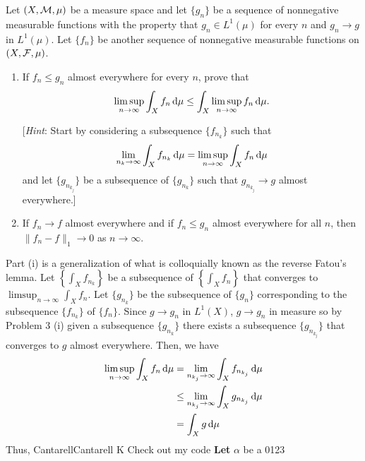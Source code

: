 \begin{problem}
  Let $(X,\mathcal{M},\mu)$ be a measure space and let $\{g_n\}$ be a sequence of
  nonnegative measurable functions with the property that $g_n\in L^1(\mu)$
  for every $n$ and $g_n\to g$ in $L^1(\mu)$. Let $\{f_n\}$ be another
  sequence of nonnegative measurable functions on $(X,\mathcal{F},\mu)$.
  \begin{enumerate}[label=(\roman*),noitemsep]
  \item If $f_n\leq g_n$ almost everywhere for every $n$, prove that
    \[
      \limsup_{n\to\infty}\int_X
      f_n\mathop{}\!\mathrm{d}\mu\leq\int_X\limsup_{n\to\infty}f_n\mathop{}\!\mathrm{d}\mu.
    \]

    [\emph{Hint}: Start by considering a subsequence $\{f_{n_k}\}$ such
    that
    \[
      \lim_{n_k\to\infty}\int_X
      f_{n_k}\mathop{}\!\mathrm{d}\mu=\limsup_{n\to\infty}\int_X f_n\mathop{}\!\mathrm{d}\mu
    \]
    and let $\{g_{n_{k_j}}\}$ be a subsequence of $\{g_{n_k}\}$ such
    that $g_{n_{k_j}}\to g$ almost everywhere.]
  \item If $f_n\to f$ almost everywhere and if $f_n\leq g_n$ almost
    everywhere for all $n$, then $\|f_n-f\|_1\to 0$ as $n\to\infty$.
  \end{enumerate}
\end{problem}
\begin{solution}
  Part (i) is a generalization of what is colloquially known as the reverse
  Fatou's lemma. Let $\left\{\int_X f_{n_k}\right\}$ be a subsequence of
  $\left\{\int_X f_n\right\}$ that converges to
  $\limsup_{n\to\infty}\int_X f_n$. Let $\{g_{n_k}\}$ be the subsequence of
  $\{g_n\}$ corresponding to the subsequence $\{f_{n_k}\}$ of
  $\{f_n\}$. Since $g\to g_n$ in $L^1(X)$, $g\to g_n$ in measure so by
  Problem 3 (i) given a subsequence $\{g_{n_k}\}$ there exists a
  subsequence $\{g_{n_{k_j}}\}$ that converges to $g$ almost
  everywhere. Then, we have
  \begin{align*}
    \limsup_{n\to\infty}\int_X f_n\diff\mu%
    &=\lim_{n_{k_j}\to\infty}\int_X f_{n_{k_j}}\diff\mu\\
    &\leq\lim_{n_{k_j}\to\infty}\int_X g_{n_{k_j}}\diff\mu\\
    &=\int_X g\diff\mu
  \end{align*}
  Thus, Cantarell\textsf{Cantarell} \textsf{K} Check out
  my code
  \textsf{\textbf{Let} $\alpha$ be a 0123}
\end{solution}

